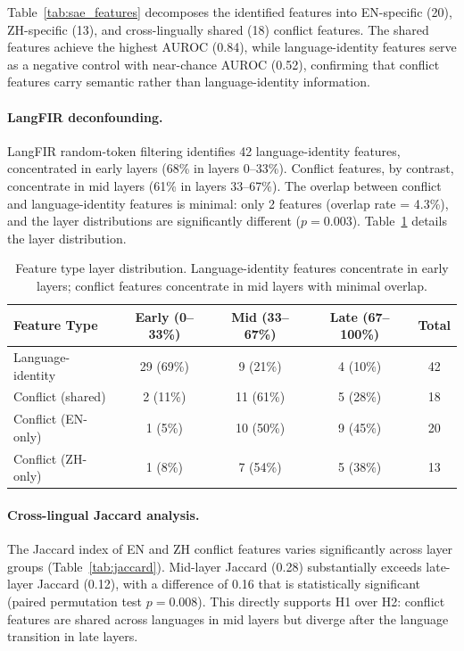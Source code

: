 \documentclass{article}
\begin{document}
Table~\ref{tab:sae_features} decomposes the identified features into EN-specific (20), ZH-specific (13), and cross-lingually shared (18) conflict features. The shared features achieve the highest AUROC (0.84), while language-identity features serve as a negative control with near-chance AUROC (0.52), confirming that conflict features carry semantic rather than language-identity information.

\paragraph{LangFIR deconfounding.}
LangFIR random-token filtering identifies 42 language-identity features, concentrated in early layers (68\% in layers 0--33\%). Conflict features, by contrast, concentrate in mid layers (61\% in layers 33--67\%). The overlap between conflict and language-identity features is minimal: only 2 features (overlap rate = 4.3\%), and the layer distributions are significantly different ($p = 0.003$). Table~\ref{tab:langfir} details the layer distribution.

\begin{table}[t]
\centering
\caption{Feature type layer distribution. Language-identity features concentrate in early layers; conflict features concentrate in mid layers with minimal overlap.}
\label{tab:langfir}
\small
\begin{tabular}{lcccc}
\toprule
Feature Type & Early (0--33\%) & Mid (33--67\%) & Late (67--100\%) & Total \\
\midrule
Language-identity & 29 (69\%) & 9 (21\%) & 4 (10\%) & 42 \\
Conflict (shared) & 2 (11\%) & 11 (61\%) & 5 (28\%) & 18 \\
Conflict (EN-only) & 1 (5\%) & 10 (50\%) & 9 (45\%) & 20 \\
Conflict (ZH-only) & 1 (8\%) & 7 (54\%) & 5 (38\%) & 13 \\
\bottomrule
\end{tabular}
\end{table}

\paragraph{Cross-lingual Jaccard analysis.}
The Jaccard index of EN and ZH conflict features varies significantly across layer groups (Table~\ref{tab:jaccard}). Mid-layer Jaccard (0.28) substantially exceeds late-layer Jaccard (0.12), with a difference of 0.16 that is statistically significant (paired permutation test $p = 0.008$). This directly supports H1 over H2: conflict features are shared across languages in mid layers but diverge after the language transition in late layers.
\end{document}
